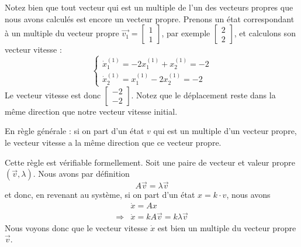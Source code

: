         Notez bien que tout vecteur qui est un multiple de l'un des vecteurs propres que nous avons calculés est encore un vecteur propre.
        Prenons un état correspondant à un multiple du vecteur propre $\overrightarrow{v_1} = \begin{bmatrix} 1 \\ 1 \end{bmatrix}$, par exemple $\begin{bmatrix}2\\ 2\end{bmatrix}$, et calculons son vecteur vitesse :
        \begin{equation}
            \begin{cases}
                \dot{x}^{(1)}_1 = -2x^{(1)}_1 + x^{(1)}_2 = -2 \\
                \dot{x}^{(1)}_2 = x^{(1)}_1 - 2x^{(1)}_2 = -2
            \end{cases}
        \end{equation}
        Le vecteur vitesse est donc $\begin{bmatrix}-2\\ -2\end{bmatrix}$. Notez que le déplacement reste dans la même direction que notre vecteur vitesse initial.

        En règle générale : si on part d'un état $v$ qui est un multiple d'un vecteur propre, le vecteur vitesse a la même direction que ce vecteur propre.
        
        Cette règle est vérifiable formellement. Soit une paire de vecteur et valeur propre $(\overrightarrow v, \lambda)$. Nous avons par définition
        \begin{equation}
            A \overrightarrow v = \lambda \overrightarrow v
        \end{equation}
        et donc, en revenant au système, si on part d'un état $x = k \cdot v$, nous avons
        \begin{equation}
            \begin{split}
                &\dot{x} = A x \\
                \Rightarrow& \dot{x} = k A \overrightarrow v = k \lambda \overrightarrow v
            \end{split}
        \end{equation}
        Nous voyons donc que le vecteur vitesse $\dot{x}$ est bien un multiple du vecteur propre $\overrightarrow v$.
